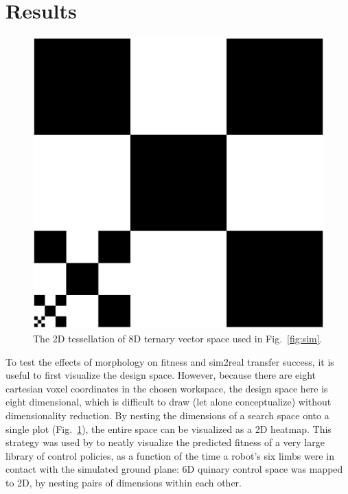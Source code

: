 
\section{Results}
\label{sec:results}


\begin{figure}
\vspace{-14pt}
\centering
\includegraphics[width=0.8\linewidth]{Chapter02/fig/legend.pdf}
\caption{The 2D tessellation of 8D ternary vector space used in Fig.~\ref{fig:sim}.}
\label{fig:tesselation}
\vspace{-1em}
\end{figure}


To test the effects of morphology on fitness and sim2real transfer success, it is useful to first visualize the design space. 
However, because there are eight cartesian voxel coordinates in the chosen workspace, the design space here is eight dimensional, which is difficult to draw (let alone conceptualize) without dimensionality reduction.
By nesting the dimensions of a search space onto a single plot (Fig.~\ref{fig:tesselation}), the entire space can be visualized as a 2D heatmap.
This strategy was used by \citet{cully2015robots} to neatly visualize the predicted fitness of a very large library of control policies, as a function of the time a robot's six limbs were in contact with the simulated ground plane: 6D quinary control space was mapped to 2D, by nesting pairs of dimensions within each other.


